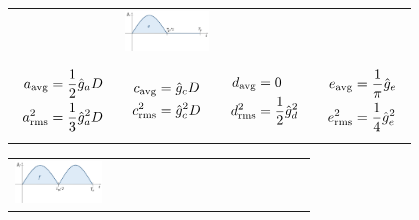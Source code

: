 \documentclass[10pt,landscape]{scrartcl}
\begin{document}
\begin{multicols}{2}
\begin{tabular}{p{0.2\linewidth} p{0.2\linewidth} p{0.2\linewidth} p{0.2\linewidth} }
  &
  \includegraphics[width=1.0\linewidth]{img/rms/signal_e.png}%
  \\
  {\begin{align*}
    a_{\textup{avg}}   &= \frac{1}{2}\hat{g}_a D \\
    a_{\textup{rms}}^2 &= \frac{1}{3}\hat{g}_a^2 D
  \end{align*}}
  &
  {\begin{align*}
    c_{\textup{avg}}   &= \hat{g}_c D \\
    c_{\textup{rms}}^2 &= \hat{g}_c^2 D
  \end{align*}}
  &
  {\begin{align*}
    d_{\textup{avg}}   &= 0 \\
    d_{\textup{rms}}^2 &= \frac{1}{2}\hat{g}_d^2
  \end{align*}}
  &
  {\begin{align*}
    e_{\textup{avg}}   &= \frac{1}{\pi}\hat{g}_e \\
    e_{\textup{rms}}^2 &= \frac{1}{4}\hat{g}_e^2
  \end{align*}}
\end{tabular}
\begin{center}
\begin{tabular}{p{0.2\linewidth} p{0.2\linewidth} p{0.2\linewidth} }
  \includegraphics[width=1.0\linewidth]{img/rms/signal_f.png}%

\end{tabular}
\end{center}
\end{multicols}
\end{document}
